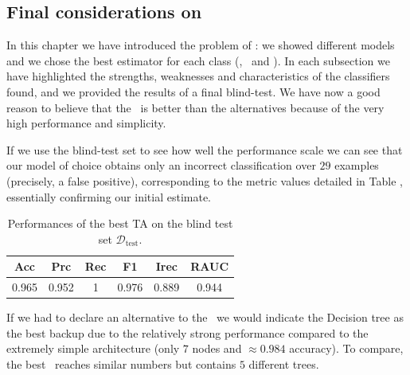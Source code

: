 \subsection{Final considerations on \qrp}
In this chapter we have introduced the problem of \qrp: we showed different models and we
chose the best estimator for each class (\dt, \rf\ and \ta). In each subsection we have
highlighted the strengths, weaknesses and characteristics of the classifiers found, and we provided the
results of a final blind-test. We have now a good reason to believe that the \ta\ is better than the
alternatives because of the very high performance and simplicity.

If we use the blind-test set to see how well the performance scale we can see that our model of
choice obtains only an incorrect classification over $29$ examples (precisely, a false positive), corresponding to the metric values detailed in Table , essentially confirming our initial estimate.

\begin{table}[!ht]
	\caption{Performances of the best TA on the blind test set $\mathscr
			D_\mathrm{test}$.}\label{tbl:qrp-ta-test}

	\setlength{\tabcolsep}{6pt}
	\centering
	\begin{tabular}{cccccc}
		\toprule
		\textbf{Acc} & \textbf{Prc} & \textbf{Rec} & \textbf{F1} & \textbf{Irec} & \textbf{RAUC} \\
		\midrule
		0.965        & 0.952        & 1            & 0.976       & 0.889         & 0.944         \\
		\bottomrule
	\end{tabular}
\end{table}

If we had to declare an alternative to the \ta\ we would indicate the Decision tree as the best backup due to
the relatively strong performance compared to the extremely simple architecture (only $7$ nodes and
$\approx 0.984$ accuracy). To compare, the best \rf\ reaches similar numbers but contains $5$
different trees.








